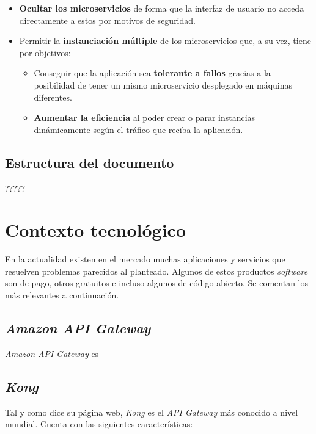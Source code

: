 \documentclass[11pt,spanish,listoffigures]{tfgetsinf}
\begin{document}
\begin{itemize}

	\item \textbf{Ocultar los microservicios} de forma que la interfaz de usuario no acceda directamente a estos por motivos de seguridad.
	
	\item Permitir la \textbf{instanciación múltiple} de los microservicios que, a su vez, tiene por objetivos:
		\begin{itemize}
		
			\item Conseguir que la aplicación sea \textbf{tolerante a fallos} gracias a la posibilidad de tener un mismo microservicio desplegado en máquinas diferentes.
			
			\item \textbf{Aumentar la eficiencia} al poder crear o parar instancias dinámicamente según el tráfico que reciba la aplicación.
			
		\end{itemize}

\end{itemize}

\section{Estructura del documento}

?????


\chapter{Contexto tecnológico}

En la actualidad existen en el mercado muchas aplicaciones y servicios que resuelven problemas parecidos al planteado. Algunos de estos productos \emph{software} son de pago, otros gratuitos e incluso algunos de código abierto. Se comentan los más relevantes a continuación.

\section{\emph{Amazon API Gateway}}
\emph{Amazon API Gateway} \cite{Amazon} es
	
\section{\emph{Kong}}
Tal y como dice su página web, \emph{Kong} \cite{Kong} es el \emph{API Gateway} más conocido a nivel mundial. Cuenta con las siguientes características:
\end{document}
